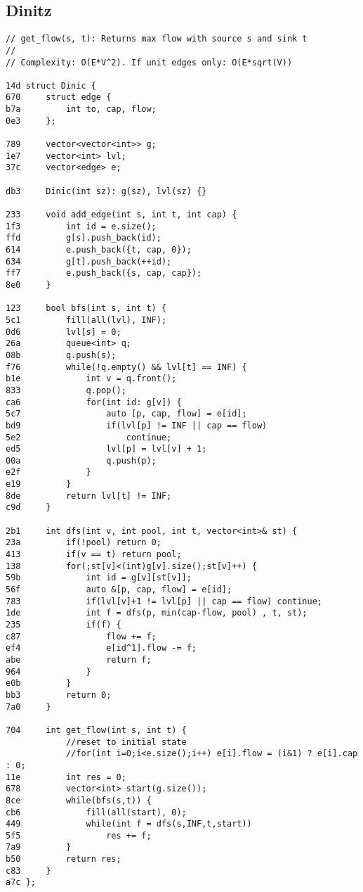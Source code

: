 \documentclass[11pt, a4paper, twoside]{article}
\begin{document}
\subsection{Dinitz}
\begin{lstlisting}
// get_flow(s, t): Returns max flow with source s and sink t
//
// Complexity: O(E*V^2). If unit edges only: O(E*sqrt(V))

14d struct Dinic {
670 	struct edge {
b7a 		int to, cap, flow;
0e3 	};
    
789 	vector<vector<int>> g;
1e7 	vector<int> lvl;
37c 	vector<edge> e;
    
db3 	Dinic(int sz): g(sz), lvl(sz) {}
    
233 	void add_edge(int s, int t, int cap) {
1f3 		int id = e.size();
ffd 		g[s].push_back(id);
614 		e.push_back({t, cap, 0});
634 		g[t].push_back(++id);
ff7 		e.push_back({s, cap, cap});
8e0 	}
    
123 	bool bfs(int s, int t) {
5c1 		fill(all(lvl), INF);
0d6 		lvl[s] = 0;
26a 		queue<int> q;
08b 		q.push(s);
f76 		while(!q.empty() && lvl[t] == INF) {
b1e 			int v = q.front();
833 			q.pop();
ca6 			for(int id: g[v]) {
5c7 				auto [p, cap, flow] = e[id];
bd9 				if(lvl[p] != INF || cap == flow)
5e2 					continue;
ed5 				lvl[p] = lvl[v] + 1;
00a 				q.push(p);
e2f 			}
e19 		}
8de 		return lvl[t] != INF;
c9d 	}
    
2b1 	int dfs(int v, int pool, int t, vector<int>& st) {
23a 		if(!pool) return 0;
413 		if(v == t) return pool;
138 		for(;st[v]<(int)g[v].size();st[v]++) {
59b 			int id = g[v][st[v]];
56f 			auto &[p, cap, flow] = e[id];
783 			if(lvl[v]+1 != lvl[p] || cap == flow) continue;
1de 			int f = dfs(p, min(cap-flow, pool) , t, st);
235 			if(f) {
c87 				flow += f;
ef4 				e[id^1].flow -= f;
abe 				return f;
964 			}
e0b 		}
bb3 		return 0;
7a0 	}
    
704 	int get_flow(int s, int t) {
    		//reset to initial state
    		//for(int i=0;i<e.size();i++) e[i].flow = (i&1) ? e[i].cap : 0;
11e 		int res = 0;
678 		vector<int> start(g.size());
8ce 		while(bfs(s,t)) {
cb6 			fill(all(start), 0);
449 			while(int f = dfs(s,INF,t,start)) 
5f5 				res += f;
7a9 		}
b50 		return res;
c83 	}
a7c };
\end{lstlisting}
\end{document}
